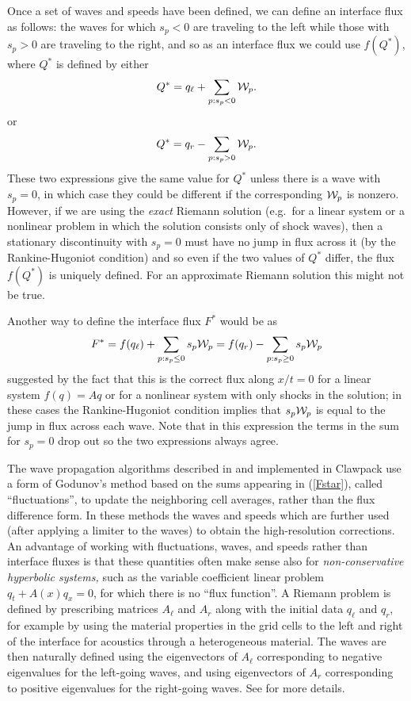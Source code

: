\documentclass[11pt]{article}
\begin{document}
Once a set of waves and speeds have been defined, we can define an
interface flux as follows: the waves for which \(s_p < 0\) are traveling
to the left while those with \(s_p>0\) are traveling to the right, and
so as an interface flux we could use \(f(Q^*)\), where \(Q^*\) is
defined by either \[
Q^* = q_\ell + \sum_{p: s_p < 0} {\cal W}_p.
\] or \[
Q^* = q_r - \sum_{p: s_p > 0} {\cal W}_p.
\] These two expressions give the same value for \(Q^*\) unless there is
a wave with \(s_p=0\), in which case they could be different if the
corresponding \({\cal W}_p\) is nonzero. However, if we are using the
\emph{exact} Riemann solution (e.g.~for a linear system or a nonlinear
problem in which the solution consists only of shock waves), then a
stationary discontinuity with \(s_p=0\) must have no jump in flux across
it (by the Rankine-Hugoniot condition) and so even if the two values of
\(Q^*\) differ, the flux \(f(Q^*)\) is uniquely defined. For an
approximate Riemann solution this might not be true.

Another way to define the interface flux \(F^*\) would be as
\begin{align}\label{Fstar}
F^* = f(q_\ell) + \sum_{p: s_p \leq 0} s_p{\cal W}_p
= f(q_r) - \sum_{p: s_p \geq 0} s_p{\cal W}_p
\end{align} suggested by the fact that this is the correct flux along
\(x/t = 0\) for a linear system \(f(q)=Aq\) or for a nonlinear system
with only shocks in the solution; in these cases the Rankine-Hugoniot
condition implies that \(s_p{\cal W}_p\) is equal to the jump in flux
across each wave. Note that in this expression the terms in the sum for
\(s_p=0\) drop out so the two expressions always agree.

    The wave propagation algorithms described in \cite{fvmhp} and
implemented in Clawpack use a form of Godunov's method based on the sums
appearing in (\ref{Fstar}), called ``fluctuations'', to update the
neighboring cell averages, rather than the flux difference form. In
these methods the waves and speeds which are further used (after
applying a limiter to the waves) to obtain the high-resolution
corrections. An advantage of working with fluctuations, waves, and
speeds rather than interface fluxes is that these quantities often make
sense also for \emph{non-conservative hyperbolic systems,} such as the
variable coefficient linear problem \(q_t + A(x)q_x = 0\), for which
there is no ``flux function''. A Riemann problem is defined by
prescribing matrices \(A_\ell\) and \(A_r\) along with the initial data
\(q_\ell\) and \(q_r\), for example by using the material properties in
the grid cells to the left and right of the interface for acoustics
through a heterogeneous material. The waves are then naturally defined
using the eigenvectors of \(A_\ell\) corresponding to negative
eigenvalues for the left-going waves, and using eigenvectors of \(A_r\)
corresponding to positive eigenvalues for the right-going waves. See
\cite{fvmhp} for more details.
\end{document}
